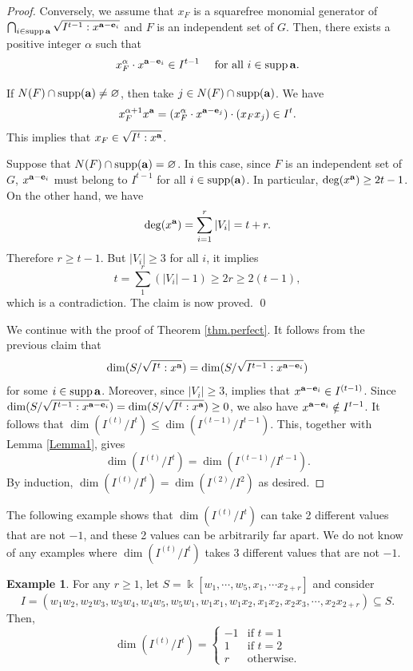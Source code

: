\documentclass[12pt]{amsart}
\numberwithin{equation}{section}
\theoremstyle{definition}
\theoremstyle{definition}
\newtheorem{example}[theorem]{Example}
\DeclareMathOperator{\supp}{supp}
\def\kk{{\Bbbk}}
\def\a{{\bold a}}
\def\e{{\bold e}}
\begin{document}
\begin{proof}
	Conversely, we assume that $x_F$ is a squarefree monomial generator of $\bigcap_{i\in \supp\a}\sqrt{I^{t-1}:x^{\a-\e_i}}$ and $F$ is an independent set of $G$. Then, there exists a positive integer $\alpha$ such that
	$$x_F^\alpha \cdot x^{\a-\e_i}\in I^{t-1}\quad\text{ for all } i\in\supp\a.$$
	
	If $N(F)\cap\supp(\a)\not= \varnothing$, then take $j \in N(F) \cap \supp(\a)$. We have
	$$x_F^{\alpha+1}x^\a=(x_F^\alpha\cdot x^{\a-\e_j})\cdot(x_Fx_j)\in I^t.$$
	This implies that $x_F\in\sqrt{I^t:x^\a}$.
	
	Suppose that $N(F)\cap\supp(\a)=\varnothing$. In this case, since $F$ is an independent set of $G$, $x^{\a-\e_i}$ must belong to $I^{t-1}$ for all $i\in\supp(\a)$. In particular, $\deg(x^\a)\ge 2t-1$. On the other hand, we have
	$$\deg(x^\a)=\sum_{i=1}^r|V_i|=t+r.$$
	Therefore $r\ge t-1$. But $|V_i|\ge 3$ for all $i$, it implies $$t=\sum_1^r(|V_i|-1)\ge 2r\ge 2(t-1),$$ which is a contradiction. The claim is now proved. \qed
	
	We continue with the proof of Theorem \ref{thm.perfect}. It follows from the previous claim that $$\dim(S/\sqrt{I^t:x^\a})=\dim(S/\sqrt{I^{t-1}:x^{\a-\e_i}})$$ for some $i\in\supp\a$. Moreover, since $|V_i|\ge 3$, \cite[Theorem 3.10]{Su2008} implies that $x^{\a-\e_i}\in I^{(t-1)}$. Since $\dim(S/\sqrt{I^{t-1}:x^{\a-\e_i}}) = \dim (S/\sqrt{I^t: x^\a}) \ge 0$, we also have $x^{\a-\e_i}\notin I^{t-1}$. It follows that $\dim(I^{(t)}/I^t)\le\dim(I^{(t-1)}/I^{t-1})$. This, together with Lemma \ref{Lemma1}, gives 
	$$\dim (I^{(t)}/I^t) = \dim (I^{(t-1)}/I^{t-1}).$$
	By induction, $\dim(I^{(t)}/I^t)=\dim(I^{(2)}/I^{2})$ as desired.
\end{proof}

The following example shows that $\dim(I^{(t)}/I^t)$ can take 2 different values that are not $-1$, and these 2 values can be arbitrarily far apart. We do not know of any examples where $\dim(I^{(t)}/I^t)$ takes 3 different values that are not $-1$.

\begin{example} \label{ex.2values}
	For any $r \ge 1$, let $S = \kk[w_1, \cdots, w_5, x_1, \cdots x_{2+r}]$ and consider 
	$$I=(w_1w_2,w_2w_3,w_3w_4,w_4w_5,w_5w_1,w_1x_1,w_1x_2,x_1x_2,x_2x_3,\cdots,x_2x_{2+r}) \subseteq S.$$
	Then, 
	$$\dim(I^{(t)}/I^t) = \left\{ \begin{array}{rl} -1 & \text{if } t = 1 \\
		1 & \text{if } t = 2 \\
		r & \text{otherwise.} \end{array} \right.$$
\end{example}
\end{document}
